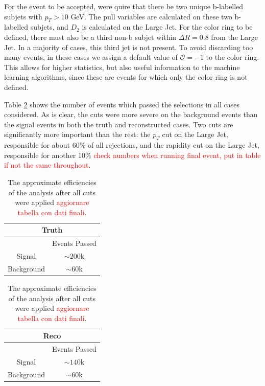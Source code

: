 \documentclass[10pt,a4paper]{book}
\newcommand\todo[1]{\textcolor{red}{#1}}
\begin{document}
For the event to be accepted, were quire that there be two unique b-labelled subjets with $p_T > 10$ GeV. The pull variables are calculated on these two b-labelled subjets, and $D_2$ is calculated on the Large Jet. For the color ring to be defined, there must also be a third non-b subjet within $\Delta R = 0.8$ from the Large Jet. In a majority of cases, this third jet is not present. To avoid discarding too many events, in these cases we assign a default value of $\mathcal{O} = -1$ to the color ring. This allows for higher statistics, but also useful information to the machine learning algorithms, since these are events for which only the color ring is not defined.

Table \ref{Efficiencies table} shows the number of events which passed the selections in all cases considered. As is clear, the cuts were more severe on the background events than the signal events in both the truth and reconstructed cases. Two cuts are significantly more important than the rest: the $p_T$ cut on the Large Jet, responsible for about 60\% of all rejections, and the rapidity cut on the Large Jet, responsible for another 10\% \todo{check numbers when running final event, put in table if not the same throughout}.

\begin{table}[!htb]
    \label{Efficiencies table}
    \begin{minipage}{.5\linewidth}
      \centering
        \begin{tabular}{|c|c|}
		\hline 
		\multicolumn{2}{|c|}{\textbf{Truth}} \\ 
		\hline 
		\* & Events Passed \\ 
		\hline 
		Signal & $\sim 200$k \\ 
		\hline 
		Background & $\sim 60$k \\ 
		\hline 
		\end{tabular}  
    \end{minipage}%
    \begin{minipage}{.5\linewidth}
      \centering
        \begin{tabular}{|c|c|}
		\hline 
		\multicolumn{2}{|c|}{\textbf{Reco}} \\ 
		\hline 
		\* & Events Passed \\ 
		\hline 
		Signal & $\sim 140$k \\ 
		\hline 
		Background & $\sim 60$k \\ 
		\hline 
		\end{tabular} 
    \end{minipage} 
    \caption{The approximate efficiencies of the analysis after all cuts were applied \todo{aggiornare tabella con dati finali}.}
\end{table}
\end{document}
